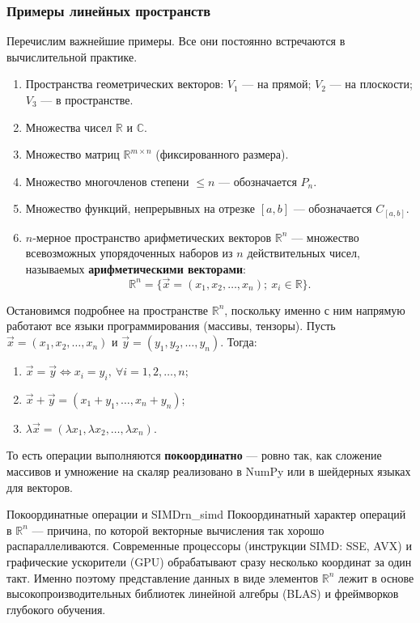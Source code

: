 \documentclass[12pt,a4paper]{article}
\begin{document}
\subsubsection*{Примеры линейных пространств}

Перечислим важнейшие примеры. Все они постоянно встречаются в
вычислительной практике.

\begin{enumerate}
\item Пространства геометрических векторов: $V_1$ — на прямой;
$V_2$ — на плоскости; $V_3$ — в пространстве.
\item Множества чисел $\mathbb{R}$ и $\mathbb{C}$.
\item Множество матриц $\mathbb{R}^{m \times n}$ (фиксированного
размера).
\item Множество многочленов степени $\le n$ — обозначается $P_n$.
\item Множество функций, непрерывных на отрезке $[a, b]$ —
обозначается $C_{[a,b]}$.
\item $n$-мерное пространство арифметических векторов $\mathbb{R}^n$ —
множество всевозможных упорядоченных наборов из $n$ действительных
чисел, называемых \textbf{арифметическими векторами}:
\[
\mathbb{R}^n = \{ \vec{x} = (x_1, x_2, \dots, x_n);\ x_i \in \mathbb{R} \}.
\]
\end{enumerate}

Остановимся подробнее на пространстве $\mathbb{R}^n$, поскольку именно с
ним напрямую работают все языки программирования (массивы, тензоры).
Пусть $\vec{x} = (x_1, x_2, \dots, x_n)$ и
$\vec{y} = (y_1, y_2, \dots, y_n)$. Тогда:
\begin{enumerate}
\item $\vec{x} = \vec{y} \iff x_i = y_i,\ \forall i = 1, 2, \dots, n$;
\item $\vec{x} + \vec{y} = (x_1 + y_1, \dots, x_n + y_n)$;
\item $\lambda\vec{x} = (\lambda x_1, \lambda x_2, \dots, \lambda x_n)$.
\end{enumerate}
То есть операции выполняются \textbf{покоординатно} — ровно так, как
сложение массивов и умножение на скаляр реализовано в NumPy или в
шейдерных языках для векторов.

\begin{remarkIT}{Покоординатные операции и SIMD}{rn_simd}
Покоординатный характер операций в $\mathbb{R}^n$ — причина, по
которой векторные вычисления так хорошо распараллеливаются.
Современные процессоры (инструкции SIMD: SSE, AVX) и графические
ускорители (GPU) обрабатывают сразу несколько координат за один такт.
Именно поэтому представление данных в виде элементов $\mathbb{R}^n$
лежит в основе высокопроизводительных библиотек линейной алгебры
(BLAS) и фреймворков глубокого обучения.
\end{remarkIT}
\end{document}
